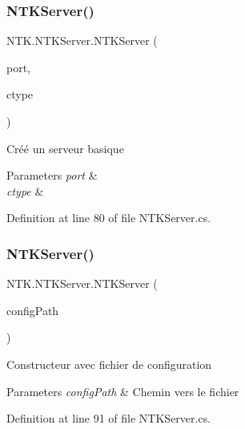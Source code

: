 \subsubsection{\texorpdfstring{NTKServer()}{NTKServer()}\hspace{0.1cm}{\footnotesize\ttfamily [1/4]}}
{\footnotesize\ttfamily N\+T\+K.\+N\+T\+K\+Server.\+N\+T\+K\+Server (\begin{DoxyParamCaption}\item[{int}]{port,  }\item[{\mbox{\hyperlink{namespace_n_t_k_a8fa28c7c4270bbb81ee96b4f632fdbec}{C\+T\+Y\+PE}}}]{ctype }\end{DoxyParamCaption})}



Créé un serveur basique 


\begin{DoxyParams}{Parameters}
{\em port} & \\
\hline
{\em ctype} & \\
\hline
\end{DoxyParams}


Definition at line 80 of file N\+T\+K\+Server.\+cs.

\mbox{\label{class_n_t_k_1_1_n_t_k_server_a2a7d90608e8ba206e00af847158ce413}} 
\subsubsection{\texorpdfstring{NTKServer()}{NTKServer()}\hspace{0.1cm}{\footnotesize\ttfamily [2/4]}}
{\footnotesize\ttfamily N\+T\+K.\+N\+T\+K\+Server.\+N\+T\+K\+Server (\begin{DoxyParamCaption}\item[{string}]{config\+Path }\end{DoxyParamCaption})}



Constructeur avec fichier de configuration 


\begin{DoxyParams}{Parameters}
{\em config\+Path} & Chemin vers le fichier\\
\hline
\end{DoxyParams}


Definition at line 91 of file N\+T\+K\+Server.\+cs.

